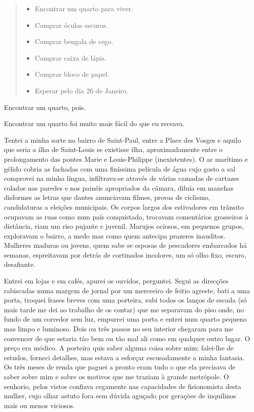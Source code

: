 \begin{quote}
\begin{itemize}
\item Encontrar um quarto para viver.

\item Comprar óculos escuros.

\item Comprar bengala de cego.

\item Comprar caixa de lápis.

\item Comprar bloco de papel.

\item Esperar pelo dia 26 de Janeiro.
\end{itemize}
\end{quote}

Encontrar um quarto, pois.

Encontrar um quarto foi muito mais fácil do que eu receava.

Tentei a minha sorte no bairro de Saint-Paul, entre a Place des Vosges e
aquilo que seria a ilha de Saint-Louis se existisse ilha,
aproximadamente entre o prolongamento das pontes Marie e Louis-Philippe
(inexistentes). O ar marítimo e gélido cobria as fachadas com uma
finíssima película de água cujo gosto a sal comprovei na minha língua,
infiltrava-se através de várias camadas de cartazes colados nas paredes
e nos painéis apropriados da câmara, diluía em manchas disformes as
letras que dantes anunciavam filmes, provas de ciclismo, candidaturas
a eleições municipais. Os corpos largos dos estivadores em trânsito
ocupavam as ruas como num país conquistado, trocavam comentários
grosseiros à distância, riam um riso pujante e juvenil. Marujos ociosos,
em pequenos grupos, exploravam o bairro, a medo mas como quem antecipa
prazeres inauditos. Mulheres maduras ou jovens, quem sabe se esposas
de pescadores embarcados há semanas, espreitavam por detrás de
cortinados incolores, um só olho fixo, escuro, desafiante.

Entrei em lojas e em cafés, apurei os ouvidos, perguntei. Segui as
direcções rabiscadas numa margem de jornal por um merceeiro de feitio
agreste, bati a uma porta, troquei frases breves com uma porteira, subi
todos os lanços de escada (só mais tarde me dei ao trabalho de os
contar) que me separavam do piso onde, no fundo de um corredor sem luz,
empurrei uma porta e entrei num quarto pequeno mas limpo e luminoso.
Dois ou três passos no seu interior chegaram para me convencer de que
estaria tão bem ou tão mal ali como em qualquer outro lugar. O preço era
módico. A porteira quis saber alguma coisa sobre mim; falei-lhe de
estudos, forneci detalhes, mas estava a esforçar escusadamente a minha
fantasia. Os três meses de renda que paguei a pronto eram tudo o que
ela precisava de saber sobre mim e sobre os motivos que me traziam à
grande metrópole. O senhorio, pelos vistos confiava cegamente nas
capacidades de fisionomista desta mulher, cujo olhar astuto fora sem
dúvida aguçado por gerações de inquilinos mais ou menos viciosos.


